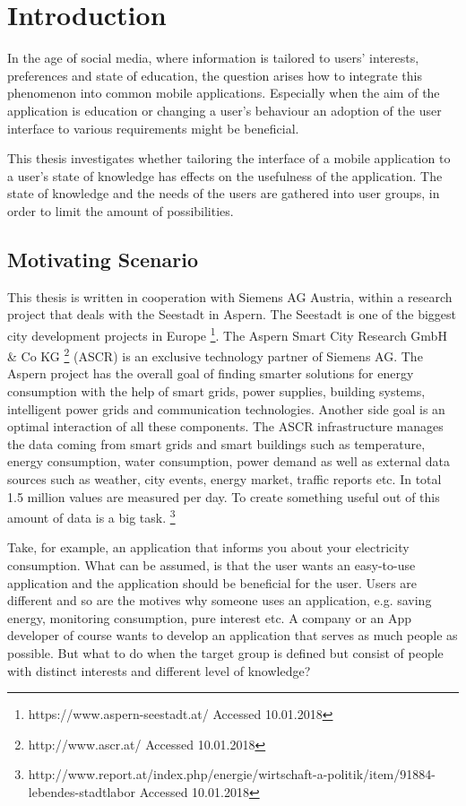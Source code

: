 \chapter{Introduction}

In the age of social media, where information is tailored to users' interests, preferences and state of education, the question arises how to integrate this phenomenon into common mobile applications. Especially when the aim of the application is education or changing a user's behaviour an adoption of the user interface to various requirements might be beneficial.

This thesis investigates whether tailoring the interface of a mobile application to a user's state of knowledge has effects on the usefulness of the application. The state of knowledge and the needs of the users are gathered into user groups, in order to limit the amount of possibilities.


\section{Motivating Scenario}

This thesis is written in cooperation with Siemens AG Austria, within a research project that deals with the Seestadt in Aspern. The Seestadt is one of the biggest city development projects in Europe \footnote{https://www.aspern-seestadt.at/ Accessed 10.01.2018}. The Aspern Smart City Research GmbH \& Co KG \footnote{http://www.ascr.at/ Accessed 10.01.2018} (ASCR) is an exclusive technology partner of Siemens AG. The Aspern project has the overall goal of finding smarter solutions for energy consumption with the help of smart grids, power supplies, building systems, intelligent power grids and communication technologies. Another side goal is an optimal interaction of all these components. The ASCR infrastructure manages the data coming from smart grids and smart buildings such as temperature, energy consumption, water consumption, power demand as well as external data sources such as weather, city events, energy market, traffic reports etc. \cite{parreira2015role} In total 1.5 million values are measured per day. To create something useful out of this amount of data is a big task. \footnote{http://www.report.at/index.php/energie/wirtschaft-a-politik/item/91884-lebendes-stadtlabor Accessed 10.01.2018}

Take, for example, an application that informs you about your electricity consumption. What can be assumed, is that the user wants an easy-to-use application and the application should be beneficial for the user. Users are different and so are the motives why someone uses an application, e.g. saving energy, monitoring consumption, pure interest etc. A company or an App developer of course wants to develop an application that serves as much people as possible. But what to do when the target group is defined but consist of people with distinct interests and different level of knowledge?

